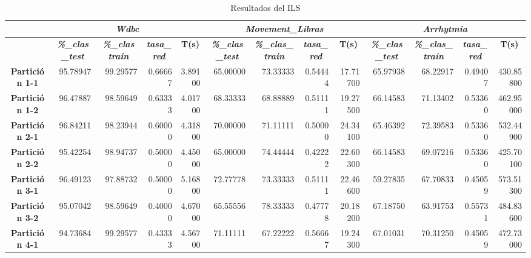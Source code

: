 \documentclass[a4paper,11pt]{article}
\begin{document}
  
  \begin{table}[H]
  \caption*{Resultados del ILS}
  \begin{adjustbox}{width=1.1\textwidth}
  \begin{tabular}{|c|r|r|r|r|r|r|r|r|r|r|r|r|}
  \hline
  \multicolumn{1}{|l|}{} & \multicolumn{ 4}{c|}{\textbf{\textit{Wdbc}}} & \multicolumn{ 4}{c|}{\textbf{\textit{Movement\_Libras}}} & \multicolumn{ 4}{c|}{\textbf{\textit{Arrhytmia}}} \\ \hline
  \multicolumn{1}{|l|}{} & \multicolumn{1}{c|}{\textbf{\textit{\%\_clas\_test}}} & \multicolumn{1}{c|}{\textbf{\textit{\%\_clas train}}} & \multicolumn{1}{c|}{\textbf{\textit{tasa\_red}}} & \multicolumn{1}{c|}{\textbf{T(s)}} & \multicolumn{1}{c|}{\textbf{\textit{\%\_clas\_test}}} & \multicolumn{1}{c|}{\textbf{\textit{\%\_clas\_train}}} & \multicolumn{1}{c|}{\textbf{\textit{tasa\_red}}} & \multicolumn{1}{c|}{\textbf{T(s)}} & \multicolumn{1}{c|}{\textbf{\textit{\%\_clas\_test}}} & \multicolumn{1}{c|}{\textbf{\textit{\%\_clas\_train}}} & \multicolumn{1}{c|}{\textbf{\textit{tasa\_red}}} & \multicolumn{1}{c|}{\textbf{T(s)}} \\ \hline
  \textbf{Partición 1-1} & 95.78947 & 99.29577 & 0.66667 & 3.89100 & 65.00000 & 73.33333 & 0.54444 & 17.71700 & 65.97938 & 68.22917 & 0.49407 & 430.85800 \\ \hline
  \textbf{Partición 1-2} & 96.47887 & 98.59649 & 0.63333 & 4.01700 & 68.33333 & 68.88889 & 0.51111 & 19.27500 & 66.14583 & 71.13402 & 0.53360 & 462.95000 \\ \hline
  \textbf{Partición 2-1} & 96.84211 & 98.23944 & 0.60000 & 4.31800 & 70.00000 & 71.11111 & 0.50000 & 24.34100 & 65.46392 & 72.39583 & 0.53360 & 532.44900 \\ \hline
  \textbf{Partición 2-2} & 95.42254 & 98.94737 & 0.50000 & 4.45000 & 65.00000 & 74.44444 & 0.42222 & 22.60300 & 66.14583 & 69.07216 & 0.53360 & 425.70100 \\ \hline
  \textbf{Partición 3-1} & 96.49123 & 97.88732 & 0.50000 & 5.16800 & 72.77778 & 73.33333 & 0.51111 & 22.46600 & 59.27835 & 67.70833 & 0.45059 & 573.51300 \\ \hline
  \textbf{Partición 3-2} & 95.07042 & 98.59649 & 0.40000 & 4.67000 & 65.55556 & 78.33333 & 0.47778 & 20.18200 & 67.18750 & 63.91753 & 0.55731 & 484.83600 \\ \hline
  \textbf{Partición 4-1} & 94.73684 & 99.29577 & 0.43333 & 4.56700 & 71.11111 & 67.22222 & 0.56667 & 19.24300 & 67.01031 & 70.31250 & 0.45059 & 472.73000 \\ \hline

\end{tabular}
\end{adjustbox}
\end{table}
\end{document}

